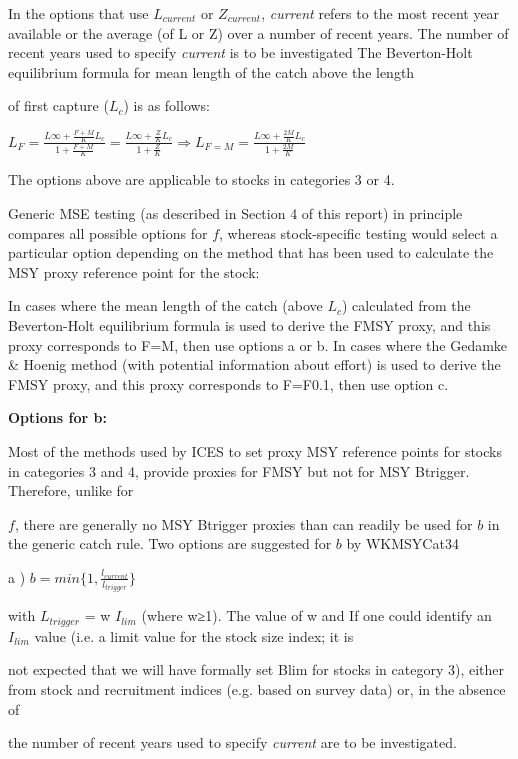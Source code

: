 In the options that use $L_{current}$ or $Z_{current}$, \textit{current} refers to the most recent year available or the average (of L or Z) over a number of recent years. The number of recent years used to specify \textit{current} is to be investigated The Beverton-Holt equilibrium formula for mean length of the catch above the length 

of first capture ($L_c$) is as follows: 

$L_{F} = \frac{L\infty +\frac{F+M}{K}L_c}{1+\frac{F+M}{K}} =
         \frac{L\infty +\frac{Z}{K}L_c}{1+\frac{Z}{K}} \Rightarrow L_{F=M} = \frac{L\infty +\frac{2M}{K}L_c}{1+\frac{2M}{K}}$

The options above are applicable to stocks in categories 3 or 4. 

Generic MSE testing (as described in Section 4 of this report) in principle compares all possible options for $f$, whereas stock-specific testing would select a particular option depending on the method that has  been used to calculate the MSY proxy reference point for the stock: 


In  cases  where  the  mean  length  of  the  catch  (above  $L_c$)  calculated  from the Beverton-Holt equilibrium formula is used to derive the FMSY proxy, and this proxy corresponds to F=M, then use options a or b.  In  cases  where  the  Gedamke  \&  Hoenig  method  (with  potential  information about effort) is used to derive the FMSY proxy, and this proxy corresponds to F=F0.1, then use option c. 

\textbf{Options for b:} 

Most of the methods used by ICES to set proxy MSY reference points for stocks in categories 3 and 4, provide proxies for FMSY but not for MSY Btrigger. Therefore, unlike for 

$f$, there are generally no MSY Btrigger proxies than can readily be used for $b$ in the generic catch rule. Two options are suggested for $b$ by WKMSYCat34 

a ) $b= min\lbrace{ 1,\frac{l_{current}}{l_{trigger}}\rbrace}$

with $L_{trigger}$ = w $I_{lim}$ (where w≥1). The value of w and If one could identify an $I_{lim}$ value (i.e. a limit value for the stock size index; it is 

not expected that we will have formally set Blim for stocks in category 3), either from stock and recruitment indices (e.g. based on survey data) or, in the absence of 

the number of recent years used to specify \textit{current} are to be investigated. 


